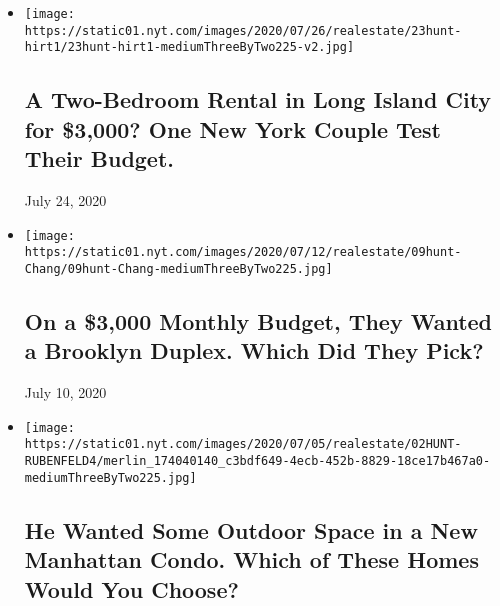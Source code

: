 \begin{itemize}
\item
  \href{https://www.nytimes.com/interactive/2020/07/23/realestate/23hunt-hirt.html}{}

  \texttt{[image: https://static01.nyt.com/images/2020/07/26/realestate/23hunt-hirt1/23hunt-hirt1-mediumThreeByTwo225-v2.jpg]}

  \hypertarget{a-two-bedroom-rental-in-long-island-city-for-3000-one-new-york-couple-test-their-budget}{%
  \subsection{A Two-Bedroom Rental in Long Island City for \$3,000? One
  New York Couple Test Their
  Budget.}\label{a-two-bedroom-rental-in-long-island-city-for-3000-one-new-york-couple-test-their-budget}}

  July 24, 2020
\item
  \href{https://www.nytimes.com/interactive/2020/07/09/realestate/09hunt-chang.html}{}

  \texttt{[image: https://static01.nyt.com/images/2020/07/12/realestate/09hunt-Chang/09hunt-Chang-mediumThreeByTwo225.jpg]}

  \hypertarget{on-a-3000-monthly-budget-they-wanted-a-brooklyn-duplex-which-did-they-pick}{%
  \subsection{On a \$3,000 Monthly Budget, They Wanted a Brooklyn
  Duplex. Which Did They
  Pick?}\label{on-a-3000-monthly-budget-they-wanted-a-brooklyn-duplex-which-did-they-pick}}

  July 10, 2020
\item
  \href{https://www.nytimes.com/interactive/2020/07/02/realestate/02hunt-rubenfeld.html}{}

  \texttt{[image: https://static01.nyt.com/images/2020/07/05/realestate/02HUNT-RUBENFELD4/merlin\_174040140\_c3bdf649-4ecb-452b-8829-18ce17b467a0-mediumThreeByTwo225.jpg]}

  \hypertarget{he-wanted-some-outdoor-space-in-a-new-manhattan-condo-which-of-these-homes-would-you-choose}{%
  \subsection{He Wanted Some Outdoor Space in a New Manhattan Condo.
  Which of These Homes Would You
  Choose?}\label{he-wanted-some-outdoor-space-in-a-new-manhattan-condo-which-of-these-homes-would-you-choose}}


\end{itemize}
